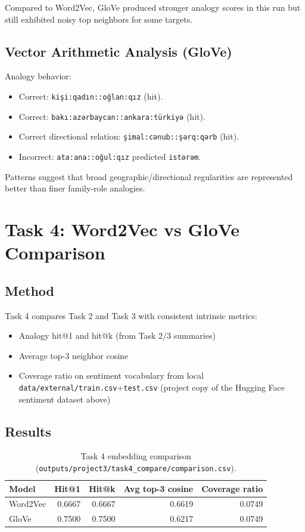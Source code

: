 \documentclass[11pt]{article}
\begin{document}
Compared to Word2Vec, GloVe produced stronger analogy scores in this run but still exhibited noisy top neighbors for some targets.

\subsection{Vector Arithmetic Analysis (GloVe)}
Analogy behavior:
\begin{itemize}
    \item Correct: \texttt{kişi:qadın::oğlan:qız} (hit).
    \item Correct: \texttt{bakı:azərbaycan::ankara:türkiyə} (hit).
    \item Correct directional relation: \texttt{şimal:cənub::şərq:qərb} (hit).
    \item Incorrect: \texttt{ata:ana::oğul:qız} predicted \texttt{istərəm}.
\end{itemize}
Patterns suggest that broad geographic/directional regularities are represented better than finer family-role analogies.

\section{Task 4: Word2Vec vs GloVe Comparison}
\subsection{Method}
Task 4 compares Task 2 and Task 3 with consistent intrinsic metrics:
\begin{itemize}
    \item Analogy hit@1 and hit@k (from Task 2/3 summaries)
    \item Average top-3 neighbor cosine
    \item Coverage ratio on sentiment vocabulary from local \texttt{data/external/train.csv}+\texttt{test.csv} (project copy of the Hugging Face sentiment dataset above)
\end{itemize}

\subsection{Results}
\begin{table}[H]
\centering
\begin{tabular}{lrrrr}
\toprule
\textbf{Model} & \textbf{Hit@1} & \textbf{Hit@k} & \textbf{Avg top-3 cosine} & \textbf{Coverage ratio} \\
\midrule
Word2Vec & 0.6667 & 0.6667 & 0.6619 & 0.0749 \\
GloVe & 0.7500 & 0.7500 & 0.6217 & 0.0749 \\
\bottomrule
\end{tabular}
\caption{Task 4 embedding comparison (\texttt{outputs/project3/task4\_compare/comparison.csv}).}
\label{tab:task4-compare}
\end{table}
\end{document}
